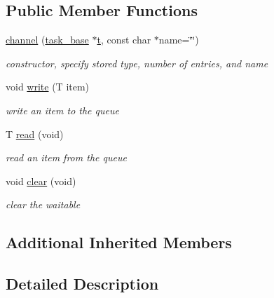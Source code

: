 \subsection*{Public Member Functions}
\begin{DoxyCompactItemize}
\item 
\hyperlink{classrtos_1_1channel_a87ceb9b710e5f20399ff35be85b21bd4}{channel} (\hyperlink{classrtos_1_1task__base}{task\+\_\+base} $\ast$\hyperlink{classrtos_1_1event_aa83745aabc941145f00386fd63f6b557}{t}, const char $\ast$name=\char`\"{}\char`\"{})
\begin{DoxyCompactList}\small\item\em constructor, specify stored type, number of entries, and name \end{DoxyCompactList}\item 
void \hyperlink{classrtos_1_1channel_ad188535be39b5884f69e3eb8edf070d4}{write} (T item)\hypertarget{classrtos_1_1channel_ad188535be39b5884f69e3eb8edf070d4}{}\label{classrtos_1_1channel_ad188535be39b5884f69e3eb8edf070d4}

\begin{DoxyCompactList}\small\item\em write an item to the queue \end{DoxyCompactList}\item 
T \hyperlink{classrtos_1_1channel_abc5c7c3294e06bb60034ea4073f00cfc}{read} (void)\hypertarget{classrtos_1_1channel_abc5c7c3294e06bb60034ea4073f00cfc}{}\label{classrtos_1_1channel_abc5c7c3294e06bb60034ea4073f00cfc}

\begin{DoxyCompactList}\small\item\em read an item from the queue \end{DoxyCompactList}\item 
void \hyperlink{classrtos_1_1channel_a0a86102d13f98ef7258a3fadbc881abd}{clear} (void)
\begin{DoxyCompactList}\small\item\em clear the waitable \end{DoxyCompactList}\end{DoxyCompactItemize}
\subsection*{Additional Inherited Members}


\subsection{Detailed Description}
